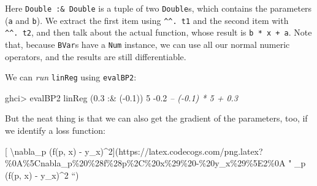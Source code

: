 \documentclass[]{article}
\newenvironment{Shaded}{}{}
\newcommand{\CommentTok}[1]{\textcolor[rgb]{0.38,0.63,0.69}{\textit{#1}}}
\newcommand{\DataTypeTok}[1]{\textcolor[rgb]{0.56,0.13,0.00}{#1}}
\newcommand{\DecValTok}[1]{\textcolor[rgb]{0.25,0.63,0.44}{#1}}
\newcommand{\FloatTok}[1]{\textcolor[rgb]{0.25,0.63,0.44}{#1}}
\newcommand{\FunctionTok}[1]{\textcolor[rgb]{0.02,0.16,0.49}{#1}}
\newcommand{\NormalTok}[1]{#1}
\newcommand{\OtherTok}[1]{\textcolor[rgb]{0.00,0.44,0.13}{#1}}
\begin{document}
Here \texttt{Double\ :\&\ Double} is a tuple of two \texttt{Double}s, which
contains the parameters (\texttt{a} and \texttt{b}). We extract the first item
using \texttt{\^{}\^{}.\ t1} and the second item with \texttt{\^{}\^{}.\ t2},
and then talk about the actual function, whose result is \texttt{b\ *\ x\ +\ a}.
Note that, because \texttt{BVar}s have a \texttt{Num} instance, we can use all
our normal numeric operators, and the results are still differentiable.

We can \emph{run} \texttt{linReg} using \texttt{evalBP2}:

\begin{Shaded}
\begin{Highlighting}[]
\NormalTok{ghci}\FunctionTok{>}\NormalTok{ evalBP2 linReg (}\FloatTok{0.3} \FunctionTok{:&}\NormalTok{ (}\FunctionTok{-}\FloatTok{0.1}\NormalTok{)) }\DecValTok{5}
\FunctionTok{-}\FloatTok{0.2}        \CommentTok{-- (-0.1) * 5 + 0.3}
\end{Highlighting}
\end{Shaded}

But the neat thing is that we can also get the gradient of the parameters, too,
if we identify a loss function:

{[} \textbackslash{}nabla\_p (f(p, x) -
y\_x)\^{}2{]}(https://latex.codecogs.com/png.latex?\%0A\%5Cnabla\_p\%20\%28f\%28p\%2C\%20x\%29\%20-\%20y\_x\%29\%5E2\%0A
" \nabla\_p (f(p, x) - y\_x)\^{}2 ``)

\begin{Shaded}
\end{Shaded}
\end{document}
